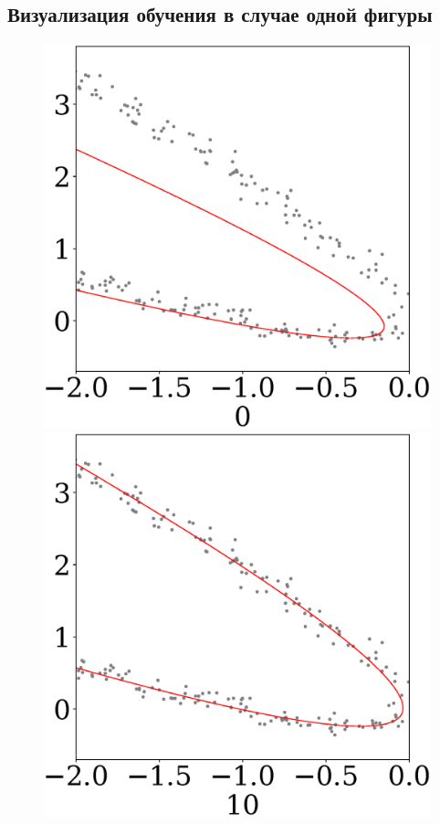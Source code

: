 \documentclass[12pt, twoside]{article}
\numberwithin{equation}{section}
\begin{document}
\subsection{Визуализация обучения в случае одной фигуры}
\begin{figure}
\begin{minipage}{.25\textwidth}
      \includegraphics[scale = 0.19]{figures/511_0}
\end{minipage}
\begin{minipage}{.25\textwidth}

      \includegraphics[scale = 0.19]{figures/511_10}
\end{minipage}
\begin{minipage}{.25\textwidth}


\end{minipage}
\end{figure}
\end{document}
